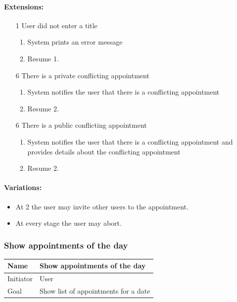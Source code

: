\documentclass[a4paper]{scrartcl}
\begin{document}
\paragraph{Extensions:}
\begin{enumerate}
	\item[1] User did not enter a title
		\begin{enumerate}
			\item System prints an error message
			\item Resume 1.
		\end{enumerate}
	\item[6] There is a private conflicting appointment
		\begin{enumerate}
			\item System notifies the user that there is a conflicting appointment
			\item Resume 2.
		\end{enumerate}
	\item[6] There is a public conflicting appointment
		\begin{enumerate}
			\item System notifies the user that there is a conflicting appointment
				and provides details about the conflicting appointment
			\item Resume 2.
		\end{enumerate}
\end{enumerate}


\paragraph{Variations:}
\begin{itemize}
	\item At 2 the user may invite other users to the appointment.
	\item At every stage the user may abort.
\end{itemize}

\subsubsection{Show appointments of the day}

\begin{tabular}{|g|l|}
	\hline Name      & Show appointments of the day         \\ 
	\hline Initiator & User                                 \\ 
	\hline Goal      & Show list of appointments for a date \\ 
	\hline
\end{tabular}
\end{document}
